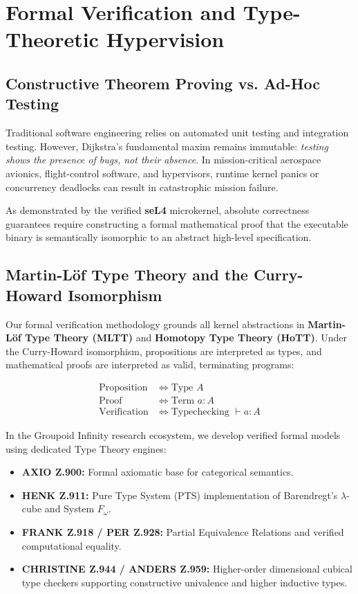 \documentclass[10pt,journal,compsoc,twocolumn]{article}
\begin{document}
\section{Formal Verification and Type-Theoretic Hypervision}
\label{sec:formal_verification}

\subsection{Constructive Theorem Proving vs. Ad-Hoc Testing}
Traditional software engineering relies on automated unit testing and integration testing. However, Dijkstra's fundamental maxim remains immutable: \emph{testing shows the presence of bugs, not their absence}. In mission-critical aerospace avionics, flight-control software, and hypervisors, runtime kernel panics or concurrency deadlocks can result in catastrophic mission failure.

As demonstrated by the verified \textbf{seL4} microkernel, absolute correctness guarantees require constructing a formal mathematical proof that the executable binary is semantically isomorphic to an abstract high-level specification.

\subsection{Martin-Löf Type Theory and the Curry-Howard Isomorphism}
Our formal verification methodology grounds all kernel abstractions in \textbf{Martin-Löf Type Theory (MLTT)} and \textbf{Homotopy Type Theory (HoTT)}. Under the Curry-Howard isomorphism, propositions are interpreted as types, and mathematical proofs are interpreted as valid, terminating programs:

\begin{align}
\text{Proposition} &\iff \text{Type } A \\
\text{Proof} &\iff \text{Term } a : A \\
\text{Verification} &\iff \text{Typechecking } \vdash a : A
\end{align}

In the Groupoid Infinity research ecosystem, we develop verified formal models using dedicated Type Theory engines:
\begin{itemize}[leftmargin=*]
    \item \textbf{AXIO Z.900:} Formal axiomatic base for categorical semantics.
    \item \textbf{HENK Z.911:} Pure Type System (PTS) implementation of Barendregt's $\lambda$-cube and System $F_\omega$.
    \item \textbf{FRANK Z.918 / PER Z.928:} Partial Equivalence Relations and verified computational equality.
    \item \textbf{CHRISTINE Z.944 / ANDERS Z.959:} Higher-order dimensional cubical type checkers supporting constructive univalence and higher inductive types.
\end{itemize}
\end{document}
